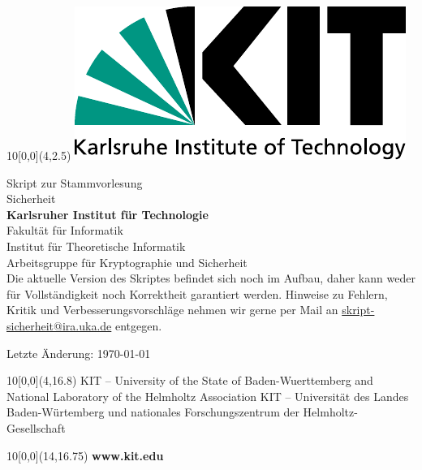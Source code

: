 \newcommand{\diameter}{20}
\newcommand{\xone}{-15}
\newcommand{\xtwo}{160}
\newcommand{\yone}{15}
\newcommand{\ytwo}{-253}

\begin{titlepage}



\begin{textblock}{10}[0,0](4,2.5)
  \includegraphics[width=.3\textwidth]{logos/KITLogo.pdf}
\end{textblock}
\vspace*{3cm}
\begin{center}
  \LARGE{Skript zur Stammvorlesung}
  \vspace*{1.5cm}\\
  \Huge{Sicherheit}\\
  \vspace*{3cm}
  \Large{\textbf{Karlsruher Institut für Technologie}\\
  \vspace*{6mm}
  Fakultät für Informatik\\
  \vspace*{4mm}
  Institut für Theoretische Informatik\\
  Arbeitsgruppe für Kryptographie und Sicherheit}\\
  
  \vspace*{2cm}
  Die aktuelle Version des Skriptes befindet sich noch im Aufbau, daher kann weder für Vollständigkeit noch Korrektheit garantiert werden. Hinweise zu Fehlern, Kritik und Verbesserungsvorschläge nehmen wir gerne per Mail an \url{skript-sicherheit@ira.uka.de} entgegen.
  
  \vspace*{2cm}
  Letzte Änderung: \today
\end{center}


\begin{textblock}{10}[0,0](4,16.8)
\tiny{
  {KIT -- University of the State of Baden-Wuerttemberg and National Laboratory of the Helmholtz Association}
  {KIT -- Universität des Landes Baden-Würtemberg und nationales Forschungszentrum der Helmholtz-Gesellschaft}
}
\end{textblock}

\begin{textblock}{10}[0,0](14,16.75)
\large{
  \textbf{www.kit.edu}
}
\end{textblock}

\end{titlepage}

